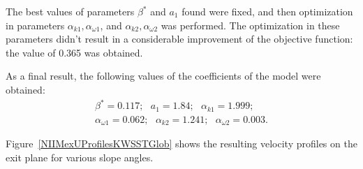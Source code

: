 \documentclass[applsci,article,submit,moreauthors,pdftex]{Definitions/mdpi}
\begin{document}
The best values of parameters $\beta^*$ and $a_1$ found were fixed, and then optimization in parameters $\alpha_{k1}, \alpha_{\omega1}$, and $\alpha_{k2}, \alpha_{\omega2}$ was performed. 
The optimization in these parameters didn't result in a considerable improvement of the objective function: the value of 0.365 was obtained.


%
%

As a final result, the following values of the coefficients of the model were obtained:
\begin{equation}
	\begin{aligned}
		\beta^* = 0.117;\ \ \ a_1 = 1.84;\ \ \ \alpha_{k 1} = 1.999;\\
		\alpha_{\omega 1} = 0.062; \ \ \ \alpha_{k 2} = 1.241;\ \ \ \alpha_{\omega 2} = 0.003.
	\end{aligned}
\end{equation}

Figure~\ref{NIIMexUProfilesKWSSTGlob} shows the resulting velocity profiles on the exit plane for various slope angles.
\end{document}
